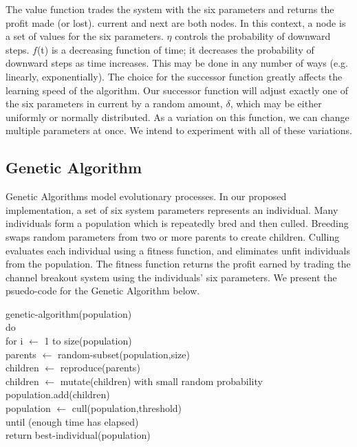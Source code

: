 \documentclass[10pt]{article}
\begin{document}
The value function trades the system with the six parameters and returns the
profit made (or lost).  current and next are both nodes.  In this context, a
node is a set of values for the six parameters.  $\eta$ controls the probability
of downward steps.  $f$(t) is a decreasing function of time; it decreases the
probability of downward steps as time increases.  This may be done in any number
of ways (e.g. linearly, exponentially).  The choice for the successor function
greatly affects the learning speed of the algorithm.  Our successor function
will adjust exactly one of the six parameters in current by a random amount,
$\delta$, which may be either uniformly or normally distributed.  As a variation
on this function, we can change multiple parameters at once.  We intend to
experiment with all of these variations.

\subsection{Genetic Algorithm}

Genetic Algorithms model evolutionary processes.  In our proposed
implementation, a set of six system parameters represents an individual.  Many
individuals form a population which is repeatedly bred and then culled.
Breeding swaps random parameters from two or more parents to create children.
Culling evaluates each individual using a fitness function, and eliminates unfit
individuals from the population.  The fitness function returns the profit earned
by trading the channel breakout system using the individuals' six parameters.
We present the psuedo-code for the Genetic Algorithm below.

\setlength{\parindent}{5mm}
\indent genetic-algorithm(population)\\
\indent \indent do\\
\indent \indent \indent for i $\leftarrow$ 1 to size(population)\\
\indent \indent \indent \indent parents $\leftarrow$ random-subset(population,size)\\
\indent \indent \indent \indent children $\leftarrow$ reproduce(parents)\\
\indent \indent \indent \indent children $\leftarrow$ mutate(children) with small random probability\\
\indent \indent \indent \indent population.add(children)\\
\indent \indent \indent population $\leftarrow$ cull(population,threshold)\\
\indent \indent until (enough time has elapsed)\\
\indent \indent return best-individual(population)\\
\setlength{\parindent}{0mm}
\end{document}

